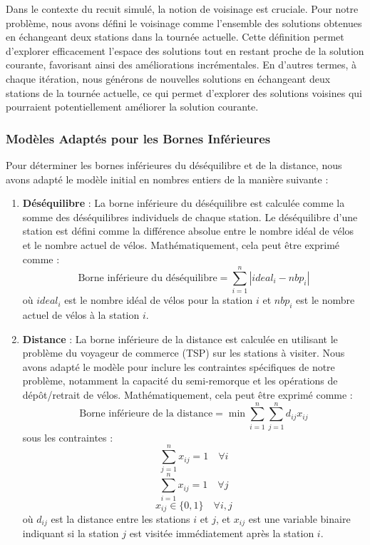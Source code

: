 \documentclass{article}
\begin{document}
Dans le contexte du recuit simulé, la notion de voisinage est cruciale. Pour notre problème, nous avons défini le voisinage comme l'ensemble des solutions obtenues en échangeant deux stations dans la tournée actuelle. Cette définition permet d'explorer efficacement l'espace des solutions tout en restant proche de la solution courante, favorisant ainsi des améliorations incrémentales. En d'autres termes, à chaque itération, nous générons de nouvelles solutions en échangeant deux stations de la tournée actuelle, ce qui permet d'explorer des solutions voisines qui pourraient potentiellement améliorer la solution courante.

\subsubsection{Modèles Adaptés pour les Bornes Inférieures}

Pour déterminer les bornes inférieures du déséquilibre et de la distance, nous avons adapté le modèle initial en nombres entiers de la manière suivante :

\begin{enumerate}
\item \textbf{Déséquilibre} : La borne inférieure du déséquilibre est calculée comme la somme des déséquilibres individuels de chaque station. Le déséquilibre d'une station est défini comme la différence absolue entre le nombre idéal de vélos et le nombre actuel de vélos. Mathématiquement, cela peut être exprimé comme :
  \[
  \text{Borne inférieure du déséquilibre} = \sum_{i=1}^n |ideal_i - nbp_i|
  \]
  où $ideal_i$ est le nombre idéal de vélos pour la station $i$ et $nbp_i$ est le nombre actuel de vélos à la station $i$.

\item \textbf{Distance} : La borne inférieure de la distance est calculée en utilisant le problème du voyageur de commerce (TSP) sur les stations à visiter. Nous avons adapté le modèle pour inclure les contraintes spécifiques de notre problème, notamment la capacité du semi-remorque et les opérations de dépôt/retrait de vélos. Mathématiquement, cela peut être exprimé comme :
  \[
  \text{Borne inférieure de la distance} = \min \sum_{i=1}^n \sum_{j=1}^n d_{ij} x_{ij}
  \]
  sous les contraintes :
  \[
  \sum_{j=1}^n x_{ij} = 1 \quad \forall i
  \]
  \[
  \sum_{i=1}^n x_{ij} = 1 \quad \forall j
  \]
  \[
  x_{ij} \in \{0,1\} \quad \forall i,j
  \]
  où $d_{ij}$ est la distance entre les stations $i$ et $j$, et $x_{ij}$ est une variable binaire indiquant si la station $j$ est visitée immédiatement après la station $i$.
\end{enumerate}
\end{document}
